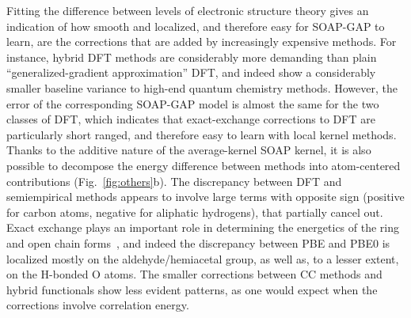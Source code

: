 \documentclass[12pt]{article}
\begin{document}
%
Fitting the difference between  
levels of electronic structure theory 
gives an indication of how smooth and localized,
and therefore easy for SOAP-GAP to learn, are the corrections
that are added by increasingly expensive methods. 
For instance, hybrid DFT methods are considerably 
more demanding than plain ``generalized-gradient approximation''
DFT, and indeed show a considerably smaller baseline variance
to high-end quantum chemistry methods. However, the 
error of the corresponding SOAP-GAP model is almost
the same for the two classes of DFT, which indicates that 
exact-exchange corrections to DFT are particularly short ranged, and
therefore easy to learn with local kernel methods.
{Thanks to the additive nature of the average-kernel SOAP kernel, it is also possible to decompose the energy difference between methods into atom-centered contributions (Fig.~\ref{fig:others}b). 
The discrepancy between DFT and semiempirical methods appears to involve large terms with opposite sign (positive for carbon atoms, negative for aliphatic hydrogens), that partially cancel out. Exact exchange plays an important role in determining the energetics of the ring and open chain forms~\cite{mari+16jctc}, and indeed the discrepancy between PBE and PBE0 is localized mostly on the aldehyde/hemiacetal group, as well as, to a lesser extent, on the H-bonded O atoms.
The smaller corrections between CC methods and hybrid functionals show less evident patterns,
as one would expect when the corrections involve correlation energy. 
}
%
%
%
%
%
%
%
%
%
%
%
%
\end{document}
